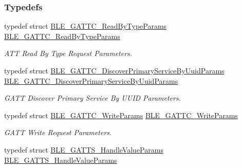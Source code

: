 \subsubsection*{Typedefs}
\begin{DoxyCompactItemize}
\item 
typedef struct \hyperlink{struct_b_l_e___g_a_t_t_c___read_by_type_params}{B\+L\+E\+\_\+\+G\+A\+T\+T\+C\+\_\+\+Read\+By\+Type\+Params} \hyperlink{group___b_l_e___g_a_t_t_ga5d40131de1c2ba44da9772c6ccfbcc43}{B\+L\+E\+\_\+\+G\+A\+T\+T\+C\+\_\+\+Read\+By\+Type\+Params}\hypertarget{group___b_l_e___g_a_t_t_ga5d40131de1c2ba44da9772c6ccfbcc43}{}\label{group___b_l_e___g_a_t_t_ga5d40131de1c2ba44da9772c6ccfbcc43}

\begin{DoxyCompactList}\small\item\em A\+TT Read By Type Request Parameters. \end{DoxyCompactList}\item 
typedef struct \hyperlink{struct_b_l_e___g_a_t_t_c___discover_primary_service_by_uuid_params}{B\+L\+E\+\_\+\+G\+A\+T\+T\+C\+\_\+\+Discover\+Primary\+Service\+By\+Uuid\+Params} \hyperlink{group___b_l_e___g_a_t_t_ga395b83607611eb337a3e6aae64263b85}{B\+L\+E\+\_\+\+G\+A\+T\+T\+C\+\_\+\+Discover\+Primary\+Service\+By\+Uuid\+Params}\hypertarget{group___b_l_e___g_a_t_t_ga395b83607611eb337a3e6aae64263b85}{}\label{group___b_l_e___g_a_t_t_ga395b83607611eb337a3e6aae64263b85}

\begin{DoxyCompactList}\small\item\em G\+A\+TT Discover Primary Service By U\+U\+ID Parameters. \end{DoxyCompactList}\item 
typedef struct \hyperlink{struct_b_l_e___g_a_t_t_c___write_params}{B\+L\+E\+\_\+\+G\+A\+T\+T\+C\+\_\+\+Write\+Params} \hyperlink{group___b_l_e___g_a_t_t_gaf94500f5ed4205d2ff7433a338f85b41}{B\+L\+E\+\_\+\+G\+A\+T\+T\+C\+\_\+\+Write\+Params}\hypertarget{group___b_l_e___g_a_t_t_gaf94500f5ed4205d2ff7433a338f85b41}{}\label{group___b_l_e___g_a_t_t_gaf94500f5ed4205d2ff7433a338f85b41}

\begin{DoxyCompactList}\small\item\em G\+A\+TT Write Request Parameters. \end{DoxyCompactList}\item 
typedef struct \hyperlink{struct_b_l_e___g_a_t_t_s___handle_value_params}{B\+L\+E\+\_\+\+G\+A\+T\+T\+S\+\_\+\+Handle\+Value\+Params} \hyperlink{group___b_l_e___g_a_t_t_ga4f14821e0aad8f7f479139dca795af51}{B\+L\+E\+\_\+\+G\+A\+T\+T\+S\+\_\+\+Handle\+Value\+Params}\hypertarget{group___b_l_e___g_a_t_t_ga4f14821e0aad8f7f479139dca795af51}{}\label{group___b_l_e___g_a_t_t_ga4f14821e0aad8f7f479139dca795af51}


\end{DoxyCompactItemize}
